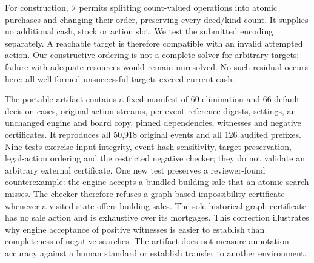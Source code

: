 For construction, $\mathcal{I}$ permits splitting count-valued operations into atomic purchases and changing their order, preserving every deed/kind count. It supplies no additional cash, stock or action slot. We test the submitted encoding separately. A reachable target is therefore compatible with an invalid attempted action. Our constructive ordering is not a complete solver for arbitrary targets; failure with adequate resources would remain unresolved. No such residual occurs here: all well-formed unsuccessful targets exceed current cash.

The portable artifact contains a fixed manifest of 60 elimination and 66 default-decision cases, original action streams, per-event reference digests, settings, an unchanged engine and board copy, pinned dependencies, witnesses and negative certificates. It reproduces all 50,918 original events and all 126 audited prefixes. Nine tests exercise input integrity, event-hash sensitivity, target preservation, legal-action ordering and the restricted negative checker; they do not validate an arbitrary external certificate. One new test preserves a reviewer-found counterexample: the engine accepts a bundled building sale that an atomic search misses. The checker therefore refuses a graph-based impossibility certificate whenever a visited state offers building sales. The sole historical graph certificate has no sale action and is exhaustive over its mortgages. This correction illustrates why engine acceptance of positive witnesses is easier to establish than completeness of negative searches. The artifact does not measure annotation accuracy against a human standard or establish transfer to another environment.
